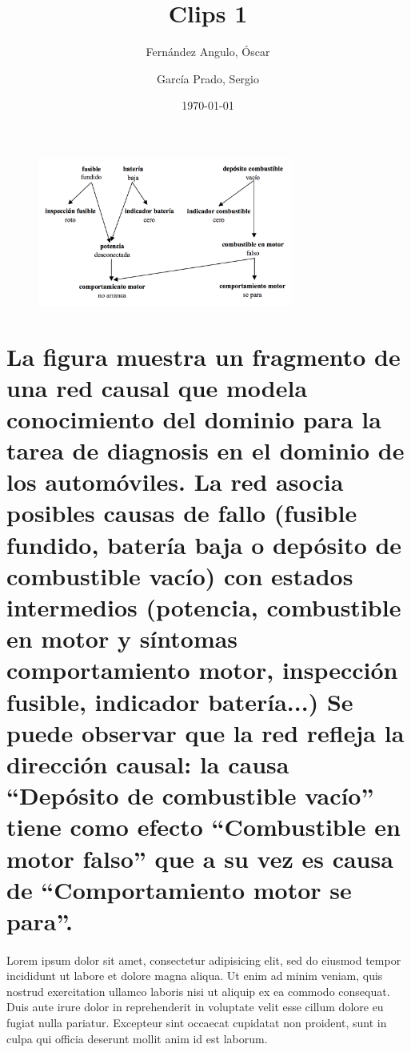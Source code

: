 \documentclass[10pt, a4paper,spanish]{article}
\title{\vspace{-15mm}\fontsize{24pt}{10pt}\selectfont\textbf{Clips 1}} %
\author{
	Fernández Angulo, Óscar \\
	\and
	García Prado, Sergio
}
\date{\today}
\begin{document}
	\maketitle %

	\thispagestyle{fancy} %




	\begin{figure}[H]
		\begin{center}
			\includegraphics[width=0.75\textwidth]{exercise-3-network}
		\end{center}
	\end{figure}

    \section{La figura muestra un fragmento de una red causal que modela conocimiento del dominio para la tarea de diagnosis en el dominio de los automóviles. La red asocia posibles causas de fallo (fusible fundido, batería baja o depósito de combustible vacío) con estados intermedios (potencia, combustible en motor y síntomas comportamiento motor, inspección fusible, indicador batería...) Se puede observar que la red refleja la dirección causal: la causa ``Depósito de combustible vacío'' tiene como efecto ``Combustible en motor falso'' que a su vez es causa de ``Comportamiento motor se para''.}

        \paragraph{}
		Lorem ipsum dolor sit amet, consectetur adipisicing elit, sed do eiusmod tempor incididunt ut labore et dolore magna aliqua. Ut enim ad minim veniam, quis nostrud exercitation ullamco laboris nisi ut aliquip ex ea commodo consequat. Duis aute irure dolor in reprehenderit in voluptate velit esse cillum dolore eu fugiat nulla pariatur. Excepteur sint occaecat cupidatat non proident, sunt in culpa qui officia deserunt mollit anim id est laborum.
\end{document}
